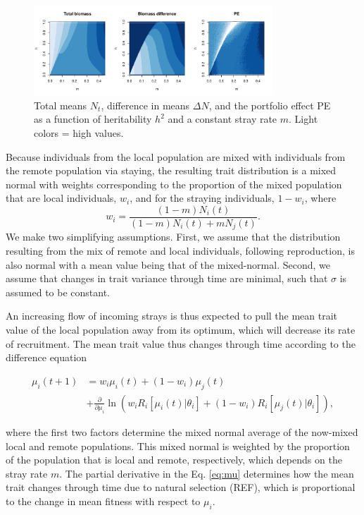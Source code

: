 \documentclass[twocolumn,preprintnumbers,amsmath,amssymb,superscriptaddress]{revtex4}
\begin{document}
\begin{figure}
\centering
\includegraphics[width=0.8\textwidth]{figs/fig_MDPE_hm.pdf}
\caption{
Total means $N_t$, difference in means $\Delta N$, and the portfolio effect PE as a function of heritability $h^2$ and a constant stray rate $m$. Light colors = high values.
} \label{fig:PE}
\end{figure}

Because individuals from the local population are mixed with individuals from the remote population via staying, the resulting trait distribution is a mixed normal with weights corresponding to the proportion of the mixed population that are local individuals, $w_i$, and for the straying individuals, $1-w_i$, where 
\begin{equation}
w_i=\frac{(1-m)N_i(t)}{(1-m) N_i(t) + m N_j(t)}.
\end{equation}
We make two simplifying assumptions.
First, we assume that the distribution resulting from the mix of remote and local individuals, following reproduction, is also normal with a mean value being that of the mixed-normal.
Second, we assume that changes in trait variance through time are minimal, such that $\sigma$ is assumed to be constant.



An increasing flow of incoming strays is thus expected to pull the mean trait value of the local population away from its optimum, which will decrease its rate of recruitment.
The mean trait value thus changes through time according to the difference equation

\begin{align}
  \mu_i(t+1) &= w_i\mu_i(t) + (1-w_i)\mu_j(t) \\ \nonumber
  &+ \frac{\partial}{\partial \mu_i}\ln\left(w_i R_i[\mu_i(t)|\theta_i] + (1-w_i)R_i[\mu_j(t)|\theta_i]  \right),
  \label{eq:mu}
\end{align}

\noindent where the first two factors determine the mixed normal average of the now-mixed local and remote populations.
This mixed normal is weighted by the proportion of the population that is local and remote, respectively, which depends on the stray rate $m$.
The partial derivative in the Eq. \ref{eq:mu} determines how the mean trait changes through time due to natural selection (REF), which is proportional to the change in mean fitness with respect to $\mu_i$.
\end{document}
